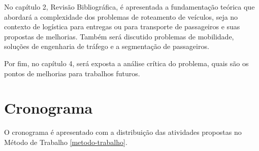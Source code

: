 No capítulo 2, Revisão Bibliográfica, é apresentada a fundamentação teórica que
abordará a complexidade dos problemas de roteamento de veículos, seja no contexto de logística para entregas ou para transporte de passageiros e suas propostas de melhorias. Também será discutido problemas de mobilidade, soluções de engenharia de tráfego e a segmentação de passageiros.

Por fim, no capítulo 4, será exposta a análise crítica do problema, quais são os pontos de melhorias para trabalhos futuros. 


\section{Cronograma}
O cronograma é apresentado com a distribuição das atividades propostas no Método de Trabalho \ref{metodo-trabalho}.

 